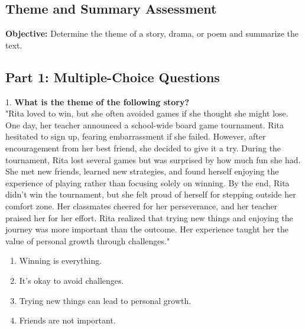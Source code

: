 \documentclass[12pt]{article}
\begin{document}
\subsection*{Theme and Summary Assessment}
\onehalfspacing

\begin{tcolorbox}[colframe=black!40, colback=gray!0, title=Learning Objective]
\textbf{Objective:} Determine the theme of a story, drama, or poem and summarize the text.
\end{tcolorbox}

\subsection*{Part 1: Multiple-Choice Questions}

1. \textbf{What is the theme of the following story?\\}
"Rita loved to win, but she often avoided games if she thought she might lose. One day, her teacher announced a school-wide board game tournament. Rita hesitated to sign up, fearing embarrassment if she failed. However, after encouragement from her best friend, she decided to give it a try. During the tournament, Rita lost several games but was surprised by how much fun she had. She met new friends, learned new strategies, and found herself enjoying the experience of playing rather than focusing solely on winning. By the end, Rita didn’t win the tournament, but she felt proud of herself for stepping outside her comfort zone. Her classmates cheered for her perseverance, and her teacher praised her for her effort. Rita realized that trying new things and enjoying the journey was more important than the outcome. Her experience taught her the value of personal growth through challenges."\\
\begin{enumerate}[label=\Alph*.]
    \item Winning is everything.  
    \item It’s okay to avoid challenges.  
    \item Trying new things can lead to personal growth.  
    \item Friends are not important.  
\end{enumerate}
\end{document}
